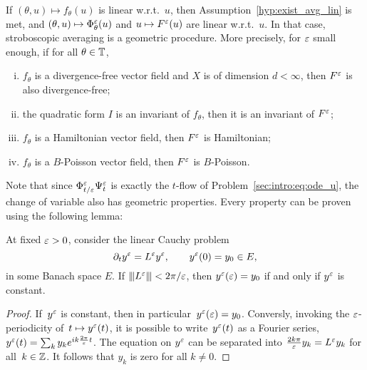\begin{theorem} \label{sec:geometry:thm:conservation} %
  If $(\theta,u) \mapsto f_\theta(u)$ is linear w.r.t.~$u$, then
  Assumption~\ref{hyp:exist_avg_lin} is met, and $(\theta,u) \mapsto
  \Phi^\varepsilon _\theta(u)$ and $u \mapsto F^\varepsilon(u)$ are linear w.r.t.~$u$.
  In that case, stroboscopic averaging is a geometric procedure. More
  precisely, for $\varepsilon$ small enough, if for all $\theta \in \mathbb{T}$, 
  \begin{enumerate}[(i)]
    \item $f_\theta$ is a divergence-free vector field and $X$ is of
    dimension $d < \infty$, then $F^\varepsilon$ is also divergence-free;
    \item the quadratic form $I$ is an invariant of $f_\theta$, then it
    is an invariant of $F^\varepsilon$;
    \item $f_\theta$ is a Hamiltonian vector field, then $F^\varepsilon$ is
    Hamiltonian;
    \item $f_\theta$ is a $B$-Poisson vector field, then $F^\varepsilon$ is
    $B$-Poisson.
  \end{enumerate}
\end{theorem}

Note that since $\Phi^\varepsilon _{t/\varepsilon} \Psi^\varepsilon _t$ is exactly the
$t$-flow of Problem~\eqref{sec:intro:eq:ode_u}, the change of variable
also has geometric properties. Every property can be proven using the
following lemma:

\begin{lemma} \label{lemma:lin_loop} %
  At fixed $\varepsilon > 0$, consider the linear Cauchy problem 
  \begin{equation} \label{lemma:lin_loop:pb}
    \partial_t y^\varepsilon = L^\varepsilon y^\varepsilon, 
    \qquad
    y^\varepsilon(0) = y_0 \in E ,
  \end{equation}
  in some Banach space $E$. If ${\left\vert\kern-0.25ex\left\vert\kern-0.25ex\left\vert L^\varepsilon \right\vert\kern-0.25ex\right\vert\kern-0.25ex\right\vert} < 2\pi/\varepsilon$, then
  $y^\varepsilon(\varepsilon) = y_0$ if and only if $y^\varepsilon$ is constant. 
\end{lemma}

\begin{proof}
  If~$y^\varepsilon$ is constant, then in particular~$y^\varepsilon(\varepsilon) = y_0$.
  Conversly, invoking the $\varepsilon$-periodicity of~$t \mapsto y^\varepsilon(t)$,
  it is possible to write~$y^\varepsilon(t)$ as a Fourier series, $y^\varepsilon(t) =
  \sum_k y_k e^{ik \frac{2\pi}{\varepsilon}t}$. The equation on $y^\varepsilon$ can be
  separated into $\frac{2k\pi}{\varepsilon} y_k = L^\varepsilon y_k$ for all~$k \in
  \mathbb{Z}$. It follows that $y_k$ is zero for all $k \neq 0$. 
\end{proof}


